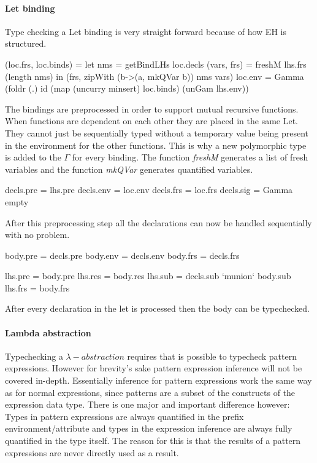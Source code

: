 \paragraph{Let binding}
Type checking a Let binding is very straight forward because of how EH is structured.

\begin{code}
    (loc.frs, loc.binds)  = let nms         = getBindLHs loc.decls
                                (vars, frs) = freshM lhs.frs (length nms)
                            in (frs, zipWith (\a b->(a, mkQVar b)) nms vars)
    loc.env   = Gamma (foldr (.) id (map (uncurry minsert) loc.binds) (unGam lhs.env))
\end{code}
The bindings are preprocessed in order to support mutual recursive functions. When functions are dependent on each other they are placed in the same Let. They cannot just be sequentially typed without a temporary value being present in the environment for the other functions. This is why a new polymorphic type is added to the $\Gamma$ for every binding. The function \emph{freshM} generates a list of fresh variables and the function \emph{mkQVar} generates quantified variables.

\begin{code}
    decls.pre = lhs.pre
    decls.env = loc.env
    decls.frs = loc.frs
    decls.sig = Gamma empty
\end{code}
After this preprocessing step all the declarations can now be handled sequentially with no problem.

\begin{code}
    body.pre = decls.pre
    body.env = decls.env 
    body.frs = decls.frs

    lhs.pre = body.pre
    lhs.res = body.res
    lhs.sub = decls.sub `munion` body.sub
    lhs.frs = body.frs
\end{code}
After every declaration in the let is processed then the body can be typechecked.

\paragraph{Lambda abstraction}
Typechecking a $\lambda-abstraction$ requires that is possible to typecheck pattern expressions. However for brevity's sake pattern expression inference will not be covered in-depth. Essentially inference for pattern expressions work the same way as for normal expressions, since patterns are a subset of the constructs of the expression data type. There is one major and important difference however: Types in pattern expressions are always quantified in the prefix environment/attribute and types in the expression inference are always fully quantified in the type itself. The reason for this is that the results of a pattern expressions are never directly used as a result.


